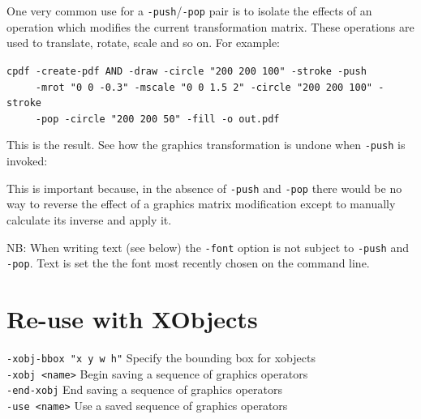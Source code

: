 \documentclass{book}
\begin{document}
\noindent One very common use for a \texttt{-push}/\texttt{-pop} pair is to isolate the effects of an operation which modifies the current transformation matrix. These operations are used to translate, rotate, scale and so on. For example: 

\begin{framed}
 \noindent\small\verb?cpdf -create-pdf AND -draw -circle "200 200 100" -stroke -push?\\
 \noindent\small\verb?     -mrot "0 0 -0.3" -mscale "0 0 1.5 2" -circle "200 200 100" -stroke?\\
 \noindent\small\verb?     -pop -circle "200 200 50" -fill -o out.pdf?
\end{framed}

\noindent This is the result. See how the graphics transformation is undone when \texttt{-push} is invoked:

\bigskip
{}
\bigskip

\noindent This is important because, in the absence of \texttt{-push} and \texttt{-pop} there would be no way to reverse the effect of a graphics matrix modification except to manually calculate its inverse and apply it.

NB: When writing text (see below) the \texttt{-font} option is not subject to \texttt{-push} and \texttt{-pop}. Text is set the the font most recently chosen on the command line.

\section{Re-use with XObjects}
  {\small\begin{framed}
   \vspace{1.5mm}
   \noindent\verb!-xobj-bbox "x y w h"! Specify the bounding box for xobjects\\
   \noindent\verb!-xobj <name>! Begin saving a sequence of graphics operators\\
   \noindent\verb!-end-xobj! End saving a sequence of graphics operators\\
   \noindent\verb!-use <name>! Use a saved sequence of graphics operators
  \end{framed}}
\end{document}
